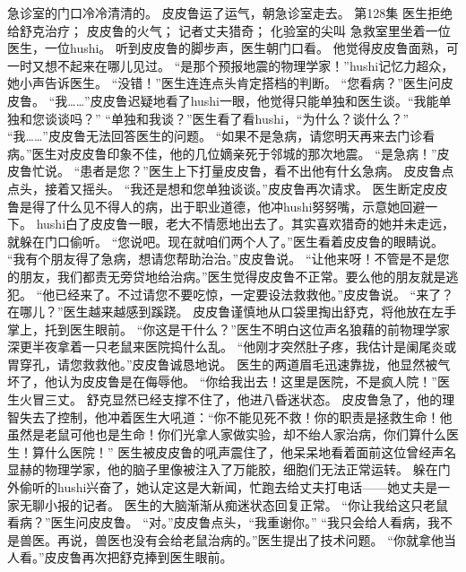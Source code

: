 \documentclass[a4paper,12pt,UTF8,twoside]{ctexbook}
\begin{document}
        急诊室的门口冷冷清清的。 
        皮皮鲁运了运气，朝急诊室走去。   第128集 
        医生拒绝给舒克治疗； 
        皮皮鲁的火气； 
        记者丈夫猎奇； 
        化验室的尖叫   
        急救室里坐着一位医生，一位hushi。 
        听到皮皮鲁的脚步声，医生朝门口看。 
        他觉得皮皮鲁面熟，可一时又想不起来在哪儿见过。 
        “是那个预报地震的物理学家！”hushi记忆力超众，她小声告诉医生。 
        “没错！”医生连连点头肯定搭档的判断。 
        “您看病？”医生问皮皮鲁。 
        “我……”皮皮鲁迟疑地看了hushi一眼，他觉得只能单独和医生谈。“我能单独和您谈谈吗？” 
        “单独和我谈？”医生看了看hushi，“为什么？谈什么？” 
        “我……”皮皮鲁无法回答医生的问题。 
        “如果不是急病，请您明天再来去门诊看病。”医生对皮皮鲁印象不佳，他的几位嫡亲死于邻城的那次地震。 
        “是急病！”皮皮鲁忙说。 
        “患者是您？”医生上下打量皮皮鲁，看不出他有什幺急病。 
        皮皮鲁点点头，接着又摇头。 
        “我还是想和您单独谈谈。”皮皮鲁再次请求。 
        医生断定皮皮鲁是得了什么见不得人的病，出于职业道德，他冲hushi努努嘴，示意她回避一下。 
        hushi白了皮皮鲁一眼，老大不情愿地出去了。其实喜欢猎奇的她并未走远，就躲在门口偷听。 
        “您说吧。现在就咱们两个人了。”医生看着皮皮鲁的眼睛说。 
        “我有个朋友得了急病，想请您帮助治治。”皮皮鲁说。 
        “让他来呀！不管是不是您的朋友，我们都责无旁贷地给治病。”医生觉得皮皮鲁不正常。要么他的朋友就是逃犯。 
        “他已经来了。不过请您不要吃惊，一定要设法救救他。”皮皮鲁说。 
        “来了？在哪儿？”医生越来越感到蹊跷。 
        皮皮鲁谨慎地从口袋里掏出舒克，将他放在左手掌上，托到医生眼前。 
        “你这是干什么？”医生不明白这位声名狼藉的前物理学家深更半夜拿着一只老鼠来医院捣什么乱。 
        “他刚才突然肚子疼，我估计是阑尾炎或胃穿孔，请您救救他。”皮皮鲁诚恳地说。 
        医生的两道眉毛迅速靠拢，他显然被气坏了，他认为皮皮鲁是在侮辱他。 
        “你给我出去！这里是医院，不是疯人院！”医生火冒三丈。 
        舒克显然已经支撑不住了，他进八昏迷状态。 
        皮皮鲁急了，他的理智失去了控制，他冲着医生大吼道：“你不能见死不救！你的职责是拯救生命！他虽然是老鼠可他也是生命！你们光拿人家做实验，却不绐人家治病，你们算什么医生！算什么医院！” 
        医生被皮皮鲁的吼声震住了，他呆呆地看着面前这位曾经声名显赫的物理学家，他的脑子里像被注入了万能胶，细胞们无法正常运转。 
        躲在门外偷听的hushi兴奋了，她认定这是大新闻，忙跑去给丈夫打电话——她丈夫是一家无聊小报的记者。 
        医生的大脑渐渐从痴迷状态回复正常。 
        “你让我给这只老鼠看病？”医生问皮皮鲁。 
        “对。”皮皮鲁点头，“我重谢你。” 
        “我只会给人看病，我不是兽医。再说，兽医也没有会给老鼠治病的。”医生提出了技术问题。 
        “你就拿他当人看。”皮皮鲁再次把舒克捧到医生眼前。 
\end{document}
